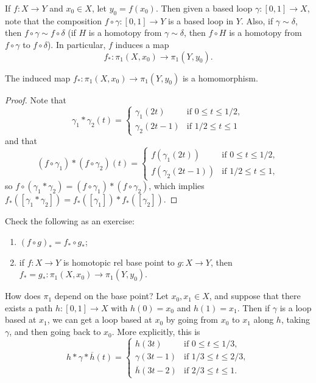 \begin{remark}
  If $f : X \to Y$ and $x_0 \in X$, let
  $y_0 = f(x_0)$. Then given a based loop
  $\gamma : [0, 1] \to X$, note that the composition
  $f \circ \gamma : [0, 1] \to Y$ is a based loop
  in $Y$. Also, if $\gamma \sim \delta$, then
  $f \circ \gamma \sim f \circ \delta$ (if
  $H$ is a homotopy from $\gamma \sim \delta$, then
  $f \circ H$ is a homotopy from $f \circ \gamma$
  to $f \circ \delta$). In particular,
  $f$ induces a map
  \[f_* : \pi_1(X, x_0) \to \pi_1(Y, y_0).\]
\end{remark}

\begin{lemma}
  The induced map $f_* : \pi_1(X, x_0) \to \pi_1(Y, y_0)$ is a homomorphism.
\end{lemma}

\begin{proof}
  Note that
  \[
    \gamma_1 * \gamma_2(t) =
    \begin{cases}
      \gamma_1(2t) & \text{if } 0 \le t \le 1 / 2, \\
      \gamma_2(2t - 1) & \text{if } 1 / 2 \le t \le 1
    \end{cases}
  \]
  and that
  \[
    (f \circ \gamma_1) * (f \circ \gamma_2)(t) =
    \begin{cases}
      f(\gamma_1(2t)) & \text{if } 0 \le t \le 1 / 2, \\
      f(\gamma_2(2t - 1)) & \text{if } 1 / 2 \le t \le 1,
    \end{cases}
  \]
  so $f \circ (\gamma_1 * \gamma_2) = (f \circ \gamma_1) * (f \circ \gamma_2)$, which implies
  $f_*([\gamma_1 * \gamma_2]) = f_*([\gamma_1]) * f_*([\gamma_2])$.
\end{proof}

\begin{exercise}
  Check the following as an exercise:
  \begin{enumerate}
    \item $(f \circ g)_* = f_* \circ g_*$;
    \item if $f : X \to Y$ is homotopic rel
      base point to $g : X \to Y$, then
      $f_* = g_* : \pi_1(X, x_0) \to \pi_1(Y, y_0)$.
  \end{enumerate}
\end{exercise}

\begin{remark}
  How does $\pi_1$ depend on the base point? Let
  $x_0, x_1 \in X$, and suppose that there
  exists a path $h : [0, 1] \to X$ with
  $h(0) = x_0$ and $h(1) = x_1$. Then if $\gamma$ is a
  loop based at $x_1$, we can get a loop based at $x_0$
  by going from $x_0$ to $x_1$ along $h$, taking
  $\gamma$, and then going back to $x_0$. More
  explicitly, this is
  \[
    h * \gamma * \overline{h}(t) =
    \begin{cases}
      h(3t) & \text{if } 0 \le t \le 1 / 3, \\
      \gamma(3t - 1) & \text{if } 1 / 3 \le t \le 2 / 3, \\
      \overline{h}(3t - 2) & \text{if } 2 / 3 \le t \le 1.
    \end{cases}
  \]
\end{remark}


